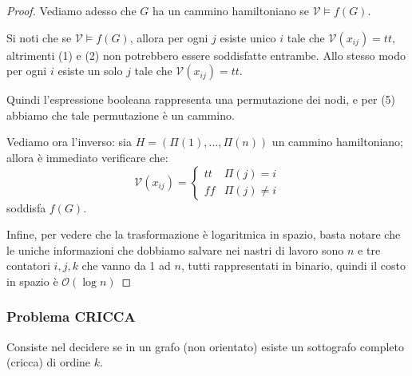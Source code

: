 \documentclass[a4paper,10pt,oneside]{article}
\theoremstyle{break}
\newcommand{\bigo}{\mathcal O}
\begin{document}
\begin{mdframed}
\begin{proof}
Vediamo adesso che $G$ ha un cammino hamiltoniano se $\mathcal V \models f(G)$.

Si noti che se $\mathcal V \models f(G)$, allora per ogni $j$ esiste unico $i$ tale che $\mathcal V(x_{ij}) = tt$, altrimenti (1) e (2) non potrebbero essere soddisfatte entrambe. Allo stesso modo per ogni $i$ esiste un solo $j$ tale che $\mathcal V(x_{ij}) = tt$. 

Quindi l'espressione booleana rappresenta una permutazione dei nodi, e per (5) abbiamo che tale permutazione è un cammino.\smallskip


Vediamo ora l'inverso: sia $H = (\Pi(1), \hdots, \Pi(n))$ un cammino hamiltoniano; allora è immediato verificare che:
\[ \mathcal V (x_{ij}) = \begin{cases}
                          tt & \Pi(j) = i\\
                          ff & \Pi(j) \neq i
                         \end{cases}
 \]
soddisfa $f(G)$.\smallskip

Infine, per vedere che la trasformazione è logaritmica in spazio, basta notare che le uniche informazioni che dobbiamo salvare nei nastri di lavoro sono $n$ e tre contatori $i, j, k$ che vanno da 1 ad $n$, tutti rappresentati in binario, quindi il costo in spazio è $\bigo(\log n)$
\end{proof}

\end{mdframed}

\newpage
\subsubsection{Problema CRICCA}
Consiste nel decidere se in un grafo (non orientato) esiste un sottografo completo (cricca) di ordine $k$.
\end{document}

